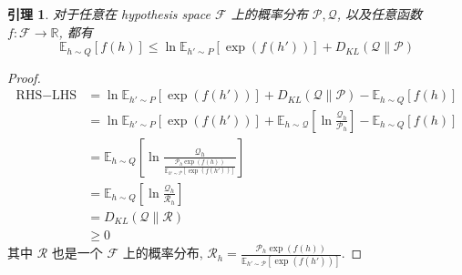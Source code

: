\documentclass[8pt]{article}
\theoremstyle{compact}
\newtheorem{lemma}{引理}[section]
\def\le{\leqslant}
\def\ge{\geqslant}
\begin{document}
\begin{lemma}
	对于任意在 hypothesis space $\mathcal F$ 上的概率分布 $\mathcal P, \mathcal Q$, 以及任意函数 $f: \mathcal F \to \mathbb R$, 都有
	$$\mathbb E_{h \sim Q}[f(h)] \le \ln \mathbb E_{h' \sim P}[\exp(f(h'))] + D_{KL}(\mathcal Q \| \mathcal P)$$
	\label{PAC-Bayesian-lem-1}
\end{lemma}
\begin{proof}
	\begin{equation*}
		\begin{split}
			\text{RHS} -\text{LHS} &= \ln \mathbb E_{h' \sim P}[\exp(f(h'))] + D_{KL}(\mathcal Q \| \mathcal P) - \mathbb E_{h \sim Q}[f(h)]\\
			&= \ln \mathbb E_{h' \sim P}[\exp(f(h'))] + \mathbb E_{h \sim \mathcal Q}\left[\ln \frac{\mathcal Q_h}{\mathcal P_h}\right] - \mathbb E_{h \sim Q}[f(h)]\\
			&= \mathbb E_{h \sim Q} \left[\ln \frac{\mathcal Q_h}{\frac{\mathcal P_h \exp(f(h))}{\mathbb E_{h' \sim \mathcal P} [\exp(f(h'))]}}\right]\\
			&= \mathbb E_{h \sim Q} \left[\ln \frac{\mathcal Q_h}{\mathcal R_h}\right]\\
			&= D_{KL}(\mathcal Q \| \mathcal R)\\
			& \ge 0
		\end{split}
	\end{equation*}
	其中 $\mathcal R$ 也是一个 $\mathcal F$ 上的概率分布, $\mathcal R_h = \frac{\mathcal P_h \exp(f(h))}{\mathbb E_{h' \sim \mathcal P} [\exp(f(h'))]}$.
\end{proof}
\end{document}
